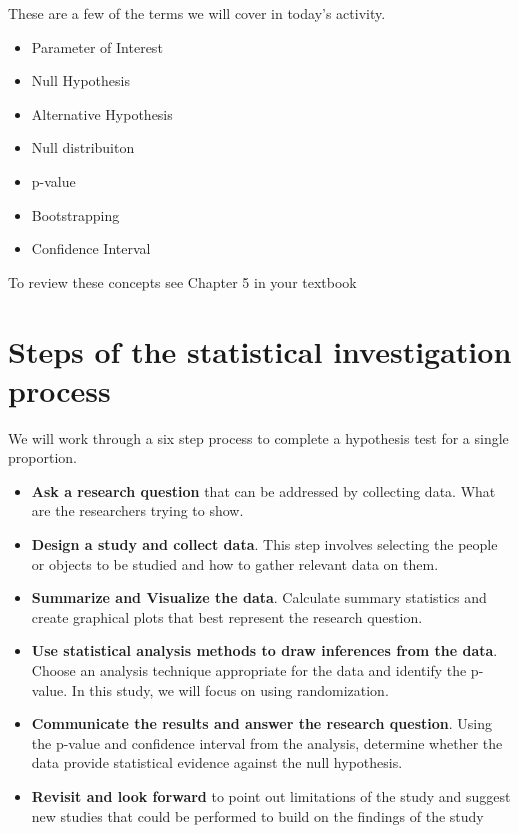 \documentclass[
]{report}
\begin{document}
These are a few of the terms we will cover in today's activity.

\begin{itemize}
\item
  Parameter of Interest
\item
  Null Hypothesis
\item
  Alternative Hypothesis
\item
  Null distribuiton
\item
  p-value
\item
  Bootstrapping
\item
  Confidence Interval
\end{itemize}

To review these concepts see Chapter 5 in your textbook

\hypertarget{steps-of-the-statistical-investigation-process}{%
\section{Steps of the statistical investigation process}\label{steps-of-the-statistical-investigation-process}}

We will work through a six step process to complete a hypothesis test for a single proportion.

\begin{itemize}
\item
  \textbf{Ask a research question} that can be addressed by collecting data. What are the researchers trying to show.
\item
  \textbf{Design a study and collect data}. This step involves selecting the people or objects to be studied and how to gather relevant data on them.
\item
  \textbf{Summarize and Visualize the data}. Calculate summary statistics and create graphical plots that best represent the research question.
\item
  \textbf{Use statistical analysis methods to draw inferences from the data}. Choose an analysis technique appropriate for the data and identify the p-value. In this study, we will focus on using randomization.
\item
  \textbf{Communicate the results and answer the research question}. Using the p-value and confidence interval from the analysis, determine whether the data provide statistical evidence against the null hypothesis.
\item
  \textbf{Revisit and look forward} to point out limitations of the study and suggest new studies that could be performed to build on the findings of the study
\end{itemize}
\end{document}
